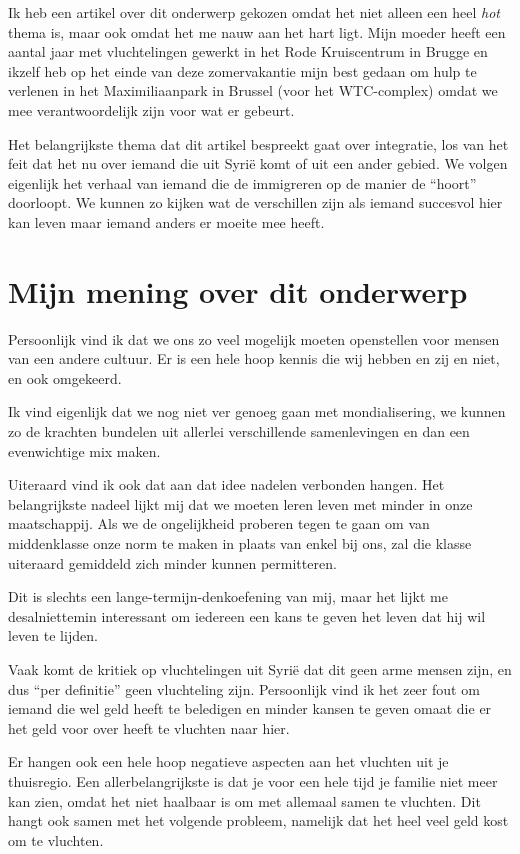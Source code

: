 \documentclass[12pt, a4paper]{paper}
\begin{document}
Ik heb een artikel over dit onderwerp gekozen omdat het niet alleen een heel \emph{hot} thema is, maar ook omdat het me nauw aan het hart ligt. Mijn moeder heeft een aantal jaar met vluchtelingen gewerkt in het Rode Kruiscentrum in Brugge en ikzelf heb op het einde van deze zomervakantie mijn best gedaan om hulp te verlenen in het Maximiliaanpark in Brussel (voor het WTC-complex) omdat we mee verantwoordelijk zijn voor wat er gebeurt.

Het belangrijkste thema dat dit artikel bespreekt gaat over integratie, los van het feit dat het nu over iemand die uit Syrië komt of uit een ander gebied. We volgen eigenlijk het verhaal van iemand die de immigreren op de manier de ``hoort'' doorloopt. We kunnen zo kijken wat de verschillen zijn als iemand succesvol hier kan leven maar iemand anders er moeite mee heeft.


\section{Mijn mening over dit onderwerp}

Persoonlijk vind ik dat we ons zo veel mogelijk moeten openstellen voor mensen van een andere cultuur. Er is een hele hoop kennis die wij hebben en zij en niet, en ook omgekeerd.

Ik vind eigenlijk dat we nog niet ver genoeg gaan met mondialisering, we kunnen zo de krachten bundelen uit allerlei verschillende samenlevingen en dan een evenwichtige mix maken.

Uiteraard vind ik ook dat aan dat idee nadelen verbonden hangen. Het belangrijkste nadeel lijkt mij dat we moeten leren leven met minder in onze maatschappij. Als we de ongelijkheid proberen tegen te gaan om van middenklasse onze norm te maken in plaats van enkel bij ons, zal die klasse uiteraard gemiddeld zich minder kunnen permitteren.

Dit is slechts een lange-termijn-denkoefening van mij, maar het lijkt me desalniettemin interessant om iedereen een kans te geven het leven dat hij wil leven te lijden.

Vaak komt de kritiek op vluchtelingen uit Syrië dat dit geen arme mensen zijn, en dus ``per definitie'' geen vluchteling zijn. Persoonlijk vind ik het zeer fout om iemand die wel geld heeft te beledigen en minder kansen te geven omaat die er het geld voor over heeft te vluchten naar hier.

Er hangen ook een hele hoop negatieve aspecten aan het vluchten uit je thuisregio. Een allerbelangrijkste is dat je voor een hele tijd je familie niet meer kan zien, omdat het niet haalbaar is om met allemaal samen te vluchten. Dit hangt ook samen met het volgende probleem, namelijk dat het heel veel geld kost om te vluchten.
\end{document}
